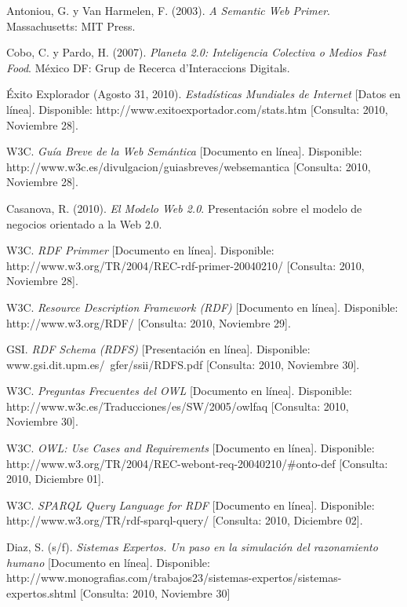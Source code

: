 \begin{thebibliography}{20}

     Antoniou, G. y Van Harmelen, F. (2003). \emph{A Semantic Web Primer}. Massachusetts: MIT Press.

     Cobo, C. y Pardo, H. (2007). \emph{Planeta 2.0: Inteligencia Colectiva o Medios Fast Food}. México DF: Grup de Recerca d'Interaccions Digitals.

     Éxito Explorador (Agosto 31, 2010). \emph{Estadísticas Mundiales de Internet} [Datos en línea]. Disponible: http://www.exitoexportador.com/stats.htm [Consulta: 2010, Noviembre 28].

     W3C. \emph{Guía Breve de la Web Semántica} [Documento en línea]. Disponible: http://www.w3c.es/divulgacion/guiasbreves/websemantica [Consulta: 2010, Noviembre 28].

     Casanova, R. (2010). \emph{El Modelo Web 2.0}. Presentación sobre el modelo de negocios orientado a la Web 2.0.

     W3C. \emph{RDF Primmer} [Documento en línea]. Disponible: http://www.w3.org/TR/2004/REC-rdf-primer-20040210/ [Consulta: 2010, Noviembre 28].

     W3C. \emph{Resource Description Framework (RDF)} [Documento en línea]. Disponible: http://www.w3.org/RDF/ [Consulta: 2010, Noviembre 29].

     GSI. \emph{RDF Schema (RDFS)} [Presentación en línea]. Disponible: www.gsi.dit.upm.es/~gfer/ssii/RDFS.pdf [Consulta: 2010, Noviembre 30].

     W3C. \emph{Preguntas Frecuentes del OWL} [Documento en línea]. Disponible: http://www.w3c.es/Traducciones/es/SW/2005/owlfaq [Consulta: 2010, Noviembre 30].

     W3C. \emph{OWL: Use Cases and Requirements} [Documento en línea]. Disponible: http://www.w3.org/TR/2004/REC-webont-req-20040210/\#onto-def [Consulta: 2010, Diciembre 01].

     W3C. \emph{SPARQL Query Language for RDF} [Documento en línea]. Disponible: http://www.w3.org/TR/rdf-sparql-query/ [Consulta: 2010, Diciembre 02].

     Diaz, S. (s/f). \emph{Sistemas Expertos. Un paso en la simulación del razonamiento humano} [Documento en línea]. Disponible: http://www.monografias.com/trabajos23/sistemas-expertos/sistemas-expertos.shtml [Consulta: 2010, Noviembre 30]


\end{thebibliography}
